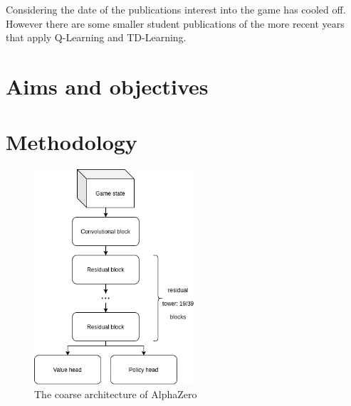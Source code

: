 \documentclass{../lib/llncs}
\begin{document}
Considering the date of the publications interest into the game has cooled off. However there are some smaller student publications of the more recent years that apply Q-Learning and TD-Learning. \cite{mizrachi_introduction_2017} \cite{lee_abalone_2005}

\section{Aims and objectives}


\section{Methodology}
\begin{figure}
  \centering
  \includegraphics[height=8cm, keepaspectratio]{alphazero_architecture_network.png}
  \caption{The coarse architecture of AlphaZero \cite{silver_mastering_2017}}
\end{figure}
\end{document}

